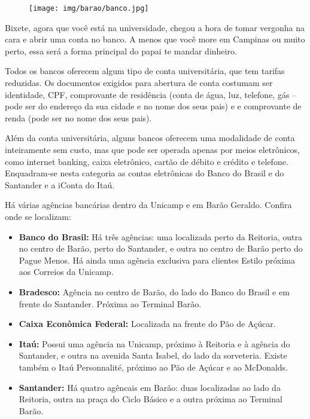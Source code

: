 \begin{figure}[h!]
    \centering
    \texttt{[image: img/barao/banco.jpg]}
\end{figure}


Bixete, agora que você está na universidade, chegou a hora de tomar vergonha na
cara e abrir uma conta no banco. A menos que você more em Campinas ou muito
perto, essa será a forma principal do papai te mandar dinheiro.

Todos os bancos oferecem algum tipo de conta universitária, que tem tarifas
reduzidas. Os documentos exigidos para abertura de conta costumam ser
identidade, CPF, comprovante de residência (conta de água, luz, telefone, gás
-- pode ser do endereço da sua cidade e no nome dos seus pais) e e comprovante
de renda (pode ser no nome dos seus pais).

Além da conta universitária, alguns bancos oferecem uma modalidade de conta
inteiramente sem custo, mas que pode ser operada apenas por meios eletrônicos,
como internet banking, caixa eletrônico, cartão de débito e crédito e telefone.
Enquadram-se nesta categoria as contas eletrônicas do Banco do Brasil e do
Santander e a iConta do Itaú.

Há várias agências bancárias dentro da Unicamp e em Barão Geraldo. Confira onde
se localizam:

\begin{itemize}
    \item  \textbf{Banco do Brasil:} Há três agências: uma localizada perto da
        Reitoria, outra no centro de Barão, perto do Santander, e outra no
        centro de Barão perto do Pague Menos. Há ainda uma agência exclusiva
        para clientes Estilo próxima aos Correios da Unicamp.

    \item  \textbf{Bradesco:} Agência no centro de Barão, do lado do Banco do
        Brasil e em frente do Santander. Próxima ao Terminal Barão.

    \item  \textbf{Caixa Econômica Federal:} Localizada na frente do Pão de
        Açúcar.

    \item  \textbf{Itaú:} Possui uma agência na Unicamp, próximo à Reitoria e à
        agência do Santander, e outra na avenida Santa Isabel, do lado da
        sorveteria. Existe também o Itaú Personnalité, próximo ao Pão de Açúcar
        e ao McDonalds.

    \item  \textbf{Santander:} Há quatro agêncais em Barão: duas localizadas ao
        lado da Reitoria, outra na praça do Ciclo Básico e a outra próxima ao
        Terminal Barão.
\end{itemize}

